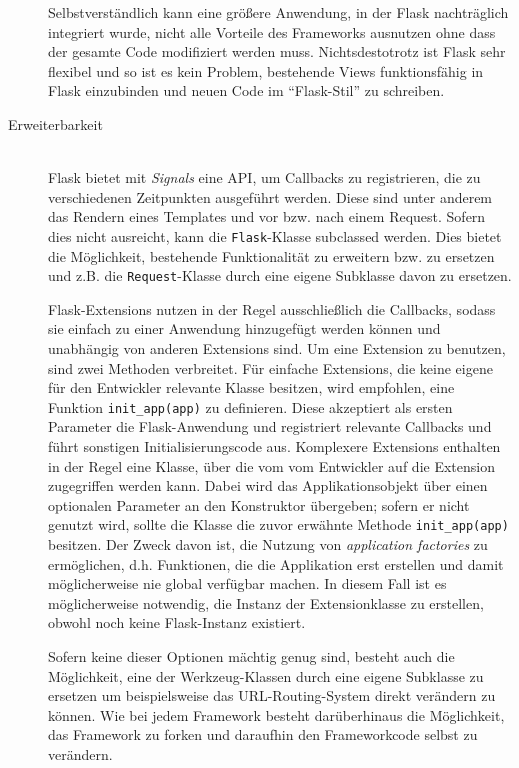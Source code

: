 \begin{description}
Selbstverständlich kann eine größere Anwendung, in der Flask nachträglich integriert wurde, nicht
alle Vorteile des Frameworks ausnutzen ohne dass der gesamte Code modifiziert werden muss.
Nichtsdestotrotz ist Flask sehr flexibel und so ist es kein Problem, bestehende Views funktionsfähig
in Flask einzubinden und neuen Code im \enquote{Flask-Stil} zu schreiben.


\item[Erweiterbarkeit] \hfill \\
Flask bietet mit \emph{Signals} eine API, um Callbacks zu registrieren, die zu verschiedenen
Zeitpunkten ausgeführt werden. Diese sind unter anderem das Rendern eines Templates und vor bzw.
nach einem Request. Sofern dies nicht ausreicht, kann die \lstinline{Flask}-Klasse subclassed
werden. Dies bietet die Möglichkeit, bestehende Funktionalität zu erweitern bzw. zu ersetzen und
z.B. die \lstinline{Request}-Klasse durch eine eigene Subklasse davon zu ersetzen.

Flask-Extensions nutzen in der Regel ausschließlich die Callbacks, sodass sie einfach zu einer
Anwendung hinzugefügt werden können und unabhängig von anderen Extensions sind. Um eine Extension zu
benutzen, sind zwei Methoden verbreitet. Für einfache Extensions, die keine eigene für den
Entwickler relevante Klasse besitzen, wird empfohlen, eine Funktion \lstinline{init_app(app)} zu
definieren. Diese akzeptiert als ersten Parameter die Flask-Anwendung und registriert relevante
Callbacks und führt sonstigen Initialisierungscode aus. Komplexere Extensions enthalten in der Regel
eine Klasse, über die vom vom Entwickler auf die Extension zugegriffen werden kann. Dabei wird das
Applikationsobjekt über einen optionalen Parameter an den Konstruktor übergeben; sofern er nicht
genutzt wird, sollte die Klasse die zuvor erwähnte Methode \lstinline{init_app(app)} besitzen. Der
Zweck davon ist, die Nutzung von \emph{application factories} zu ermöglichen, d.h. Funktionen, die
die Applikation erst erstellen und damit möglicherweise nie global verfügbar machen. In diesem Fall
ist es möglicherweise notwendig, die Instanz der Extensionklasse zu erstellen, obwohl noch keine
Flask-Instanz existiert.

Sofern keine dieser Optionen mächtig genug sind, besteht auch die Möglichkeit, eine der
Werkzeug-Klassen durch eine eigene Subklasse zu ersetzen um beispielsweise das URL-Routing-System
direkt verändern zu können. Wie bei jedem Framework besteht darüberhinaus die Möglichkeit, das
Framework zu forken und daraufhin den Frameworkcode selbst zu verändern.



\end{description}
